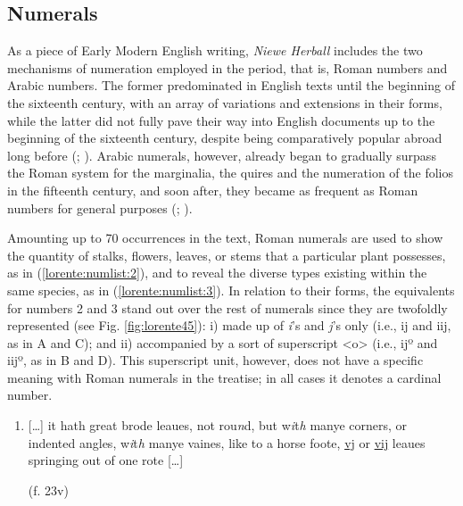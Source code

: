 \begin{paper}
\subsection{Numerals}\label{sec:numerals}

As a piece of Early Modern English writing, \emph{Niewe Herball}
includes the two mechanisms of numeration employed in the period, that
is, Roman numbers and Arabic numbers. The former predominated in English
texts until the beginning of the sixteenth century, with an array of
variations and extensions in their forms, while the latter did not fully
pave their way into English documents up to the beginning of the
sixteenth century, despite being comparatively popular abroad long
before (\cite[266]{jenkinson_use_1926}; \citep[28]{petti_english_1977}). Arabic numerals, however,
already began to gradually surpass the Roman system for the marginalia, the
quires and the numeration of the folios in the fifteenth
century, and soon after, they became as frequent as Roman numbers for
general purposes (\cite[153]{tannenbaum_handwriting_1930}; \cite[28]{petti_english_1977}).

Amounting up to 70 occurrences in the text, Roman numerals are used to
show the quantity of stalks, flowers, leaves, or stems that a particular
plant possesses, as in (\ref{lorente:numlist:2}), and to reveal the diverse types existing
within the same species, as in (\ref{lorente:numlist:3}). In relation to their forms, the
equivalents for numbers 2 and 3 stand out over the rest of numerals
since they are twofoldly represented (see Fig. \ref{fig:lorente45}): i) made up of
\emph{i}'s and \emph{j}'s only (i.e., ij and iij, as in A and C); and ii)
accompanied by a sort of superscript \textless o\textgreater{} (i.e., ijº
and iijº, as in B and D). This superscript unit, however, does not have a
specific meaning with Roman numerals in the treatise; in all cases it denotes a cardinal number.

\begin{enumerate}
\def\labelenumi{(\arabic{enumi})}
\setcounter{enumi}{1}
\item\label{lorente:numlist:2}
{[}\ldots{]} it hath great brode leaues, not rou\emph{n}d, but
w\emph{i}t\emph{h} manye corners, or indented angles, w\emph{i}t\emph{h}
manye vaines, like to a horse foote, \uline{vj} or \uline{vij} leaues
springing out of one rote {[}\ldots{]} 
\begin{flushright}
  (f. 23v)  
\end{flushright}

\vspace{1em}


\end{enumerate}
\end{paper}
